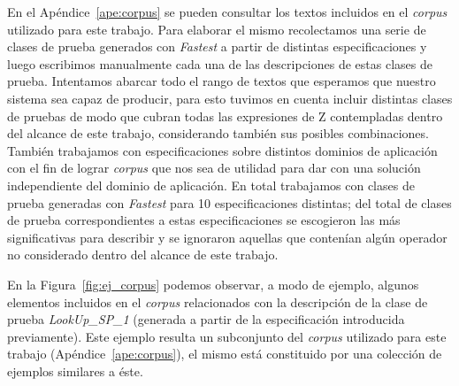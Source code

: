 En el Apéndice~\ref{ape:corpus} se pueden consultar los textos incluidos en el \emph{corpus} utilizado para este trabajo. Para elaborar el mismo recolectamos una serie de clases de prueba generados con \emph{Fastest} a partir de distintas especificaciones y luego escribimos manualmente cada una de las descripciones de estas clases de prueba. Intentamos abarcar todo el rango de textos que esperamos que nuestro sistema sea capaz de producir, para esto tuvimos en cuenta incluir distintas clases de pruebas de modo que cubran todas las expresiones de Z contempladas dentro del alcance de este trabajo, considerando también sus posibles combinaciones. También trabajamos con especificaciones sobre distintos dominios de aplicación con el fin de lograr \emph{corpus} que nos sea de utilidad para dar con una solución independiente del dominio de aplicación. En total trabajamos con clases de prueba generadas con \emph{Fastest} para 10 especificaciones distintas; del total de clases de prueba correspondientes a estas especificaciones se escogieron las más significativas para describir y se ignoraron aquellas que contenían algún operador no considerado dentro del alcance de este trabajo.


En la Figura~\ref{fig:ej_corpus} podemos observar, a modo de ejemplo, algunos elementos incluidos en el \emph{corpus} relacionados con la descripción de la clase de prueba \emph{LookUp\_SP\_1} (generada a partir de la especificación introducida previamente). Este ejemplo resulta un subconjunto del \emph{corpus} utilizado para este trabajo (Apéndice~\ref{ape:corpus}), el mismo está constituido por una colección de ejemplos similares a éste.


